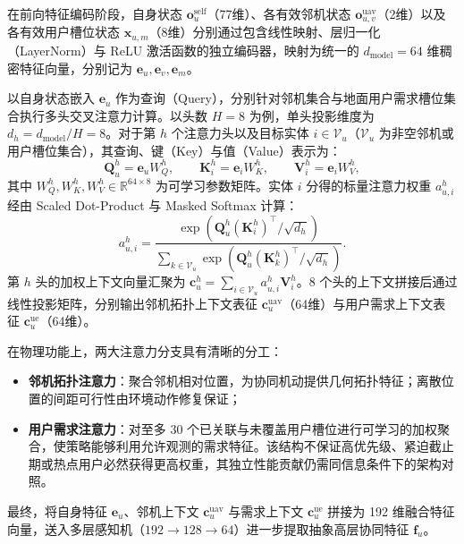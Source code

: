 在前向特征编码阶段，自身状态 $\mathbf o_u^{\mathrm{self}}$（77维）、各有效邻机状态 $\mathbf o_{u,v}^{\mathrm{uav}}$（2维）以及各有效用户槽位状态 $\mathbf x_{u,m}$（8维）分别通过包含线性映射、层归一化（LayerNorm）与 ReLU 激活函数的独立编码器，映射为统一的 $d_{\mathrm{model}}=64$ 维稠密特征向量，分别记为 $\mathbf e_u, \mathbf e_v, \mathbf e_m$。

以自身状态嵌入 $\mathbf e_u$ 作为查询（Query），分别针对邻机集合与地面用户需求槽位集合执行多头交叉注意力计算。以头数 $H=8$ 为例，单头投影维度为 $d_h = d_{\mathrm{model}} / H = 8$。对于第 $h$ 个注意力头以及目标实体 $i \in \mathcal V_u$（$\mathcal V_u$ 为非空邻机或用户槽位集合），其查询、键（Key）与值（Value）表示为：
\begin{equation}
    \mathbf Q_u^h = \mathbf e_u W_Q^h, \qquad 
    \mathbf K_i^h = \mathbf e_i W_K^h, \qquad 
    \mathbf V_i^h = \mathbf e_i W_V^h,
    \label{eq:qkv-proj}
\end{equation}
其中 $W_Q^h, W_K^h, W_V^h \in \mathbb R^{64 \times 8}$ 为可学习参数矩阵。实体 $i$ 分得的标量注意力权重 $a_{u,i}^h$ 经由 Scaled Dot-Product 与 Masked Softmax 计算：
\begin{equation}
    a_{u,i}^h = \frac{\exp\left(\mathbf Q_u^h (\mathbf K_i^h)^\top / \sqrt{d_h}\right)}{\sum_{k\in\mathcal V_u} \exp\left(\mathbf Q_u^h (\mathbf K_k^h)^\top / \sqrt{d_h}\right)}.
    \label{eq:ch3-cross-attention}
\end{equation}
第 $h$ 头的加权上下文向量汇聚为 $\mathbf c_u^h = \sum_{i\in\mathcal V_u} a_{u,i}^h \mathbf V_i^h$。8 个头的上下文拼接后通过线性投影矩阵，分别输出邻机拓扑上下文表征 $\mathbf c_u^{\mathrm{uav}}$（64维）与用户需求上下文表征 $\mathbf c_u^{\mathrm{ue}}$（64维）。

在物理功能上，两大注意力分支具有清晰的分工：
\begin{itemize}
    \item \textbf{邻机拓扑注意力}：聚合邻机相对位置，为协同机动提供几何拓扑特征；离散位置的间距可行性由环境动作修复保证；
    \item \textbf{用户需求注意力}：对至多 30 个已关联与未覆盖用户槽位进行可学习的加权聚合，使策略能够利用允许观测的需求特征。该结构不保证高优先级、紧迫截止期或热点用户必然获得更高权重，其独立性能贡献仍需同信息条件下的架构对照。
\end{itemize}

最终，将自身特征 $\mathbf e_u$、邻机上下文 $\mathbf c_u^{\mathrm{uav}}$ 与需求上下文 $\mathbf c_u^{\mathrm{ue}}$ 拼接为 192 维融合特征向量，送入多层感知机（$192 \to 128 \to 64$）进一步提取抽象高层协同特征 $\mathbf f_u$。

